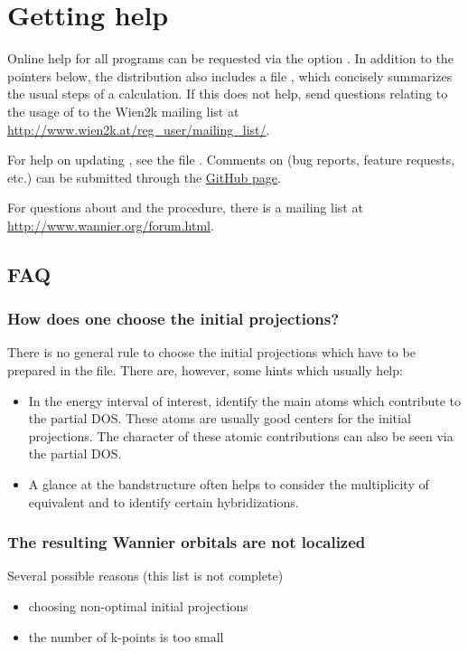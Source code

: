 \chapter{Getting help}

Online help for all programs can be requested via the option
.  In addition to the pointers below, the \wtow distribution
also includes a file , which concisely summarizes
the usual steps of a calculation.  If this does not help, send
questions relating to the usage of \wtow to the Wien2k mailing list at
\url{http://www.wien2k.at/reg_user/mailing_list/}.

For help on updating \wtow, see the file .  Comments on
\wtow (bug reports, feature requests, etc.) can be submitted through
the \href{https://github.com/wien2wannier/wien2wannier}{GitHub page}.

For questions about \wannier and the \mlwf procedure, there is a
mailing list at \url{http://www.wannier.org/forum.html}.


\section{FAQ}

\subsection{How does one choose the initial projections?}
There is no general rule to choose the initial projections which have
to be prepared in the  file. There are, however, some hints
which usually help:
\begin{itemize}
\item In the energy interval of interest, identify the main atoms
  which contribute to the partial DOS. These atoms are usually good
  centers for the initial projections. The character of these atomic
  contributions can also be seen via the partial DOS.
\item A glance at the bandstructure often helps to consider the
  multiplicity of equivalent \wf and to identify certain
  hybridizations.
\end{itemize}

\subsection{The resulting Wannier orbitals are not localized}
Several possible reasons (this list is not complete)
\begin{itemize}
\item choosing non-optimal initial projections
\item the number of k-points is too small
\end{itemize}

